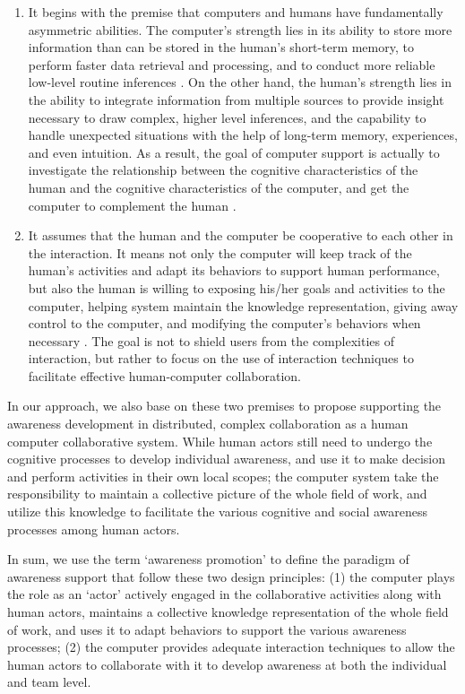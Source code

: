 \begin{enumerate}
\begin{enumerate}
   \item It begins with the premise that computers and humans have fundamentally asymmetric abilities. The computer's strength lies in its ability to store more information than can be stored in the human's short-term memory, to perform faster data retrieval and processing, and to conduct more reliable low-level routine inferences \cite{Brown99activeuser}. On the other hand, the human's strength lies in the ability to integrate information from multiple sources to provide insight necessary to draw complex, higher level inferences, and the capability to handle unexpected situations with the help of long-term memory, experiences, and even intuition. As a result, the goal of computer support is actually to investigate the relationship between the cognitive characteristics of the human and the cognitive characteristics of the computer, and get the computer to complement the human \cite{Dalal1994}.
   \item It assumes that the human and the computer be cooperative to each other in the interaction. It means not only the computer will keep track of the human's activities and adapt its behaviors to support human performance, but also the human is willing to exposing his/her goals and activities to the computer, helping system maintain the knowledge representation, giving away control to the computer, and modifying the computer's behaviors when necessary \cite{Terveen1995}. The goal is not to shield users from the complexities of interaction, but rather to focus on the use of interaction techniques to facilitate effective human-computer collaboration.
\end{enumerate}

In our approach, we also base on these two premises to propose supporting the awareness development in distributed, complex collaboration as a human computer collaborative system. While human actors still need to undergo the cognitive processes to develop individual awareness, and use it to make decision and perform activities in their own local scopes; the computer system take the responsibility to maintain a collective picture of the whole field of work, and utilize this knowledge to facilitate the various cognitive and social awareness processes among human actors.

In sum, we use the term `awareness promotion' to define the paradigm of awareness support that follow these two design principles: (1) the computer plays the role as an `actor' actively engaged in the collaborative activities along with human actors, maintains a collective knowledge representation of the whole field of work, and uses it to adapt behaviors to support the various awareness processes; (2) the computer provides adequate interaction techniques to allow the human actors to collaborate with it to develop awareness at both the individual and team level. 





\end{enumerate}
